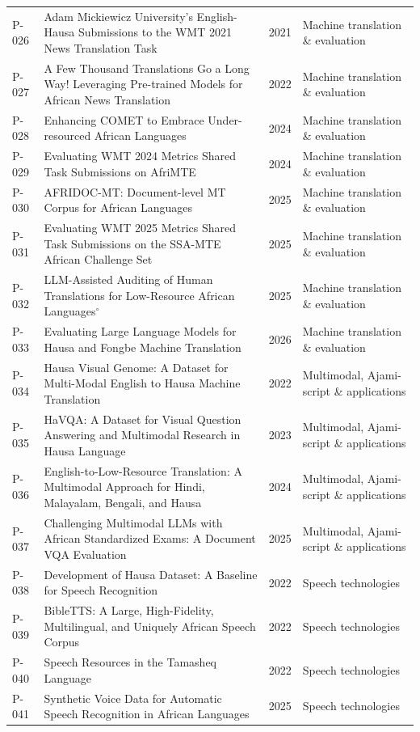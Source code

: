 \begin{longtable}{@{}p{} p{} p{} p{}@{}}
P-026 & Adam Mickiewicz University's English-Hausa Submissions to the WMT 2021 News Translation Task & 2021 & Machine translation \& evaluation \\
P-027 & A Few Thousand Translations Go a Long Way! Leveraging Pre-trained Models for African News Translation & 2022 & Machine translation \& evaluation \\
P-028 & Enhancing COMET to Embrace Under-resourced African Languages & 2024 & Machine translation \& evaluation \\
P-029 & Evaluating WMT 2024 Metrics Shared Task Submissions on AfriMTE & 2024 & Machine translation \& evaluation \\
P-030 & AFRIDOC-MT: Document-level MT Corpus for African Languages & 2025 & Machine translation \& evaluation \\
P-031 & Evaluating WMT 2025 Metrics Shared Task Submissions on the SSA-MTE African Challenge Set & 2025 & Machine translation \& evaluation \\
P-032 & LLM-Assisted Auditing of Human Translations for Low-Resource African Languages$^{\circ}$ & 2025 & Machine translation \& evaluation \\
P-033 & Evaluating Large Language Models for Hausa and Fongbe Machine Translation & 2026 & Machine translation \& evaluation \\
P-034 & Hausa Visual Genome: A Dataset for Multi-Modal English to Hausa Machine Translation & 2022 & Multimodal, Ajami-script \& applications \\
P-035 & HaVQA: A Dataset for Visual Question Answering and Multimodal Research in Hausa Language & 2023 & Multimodal, Ajami-script \& applications \\
P-036 & English-to-Low-Resource Translation: A Multimodal Approach for Hindi, Malayalam, Bengali, and Hausa & 2024 & Multimodal, Ajami-script \& applications \\
P-037 & Challenging Multimodal LLMs with African Standardized Exams: A Document VQA Evaluation & 2025 & Multimodal, Ajami-script \& applications \\
P-038 & Development of Hausa Dataset: A Baseline for Speech Recognition & 2022 & Speech technologies \\
P-039 & BibleTTS: A Large, High-Fidelity, Multilingual, and Uniquely African Speech Corpus & 2022 & Speech technologies \\
P-040 & Speech Resources in the Tamasheq Language & 2022 & Speech technologies \\
P-041 & Synthetic Voice Data for Automatic Speech Recognition in African Languages & 2025 & Speech technologies \\

\end{longtable}
